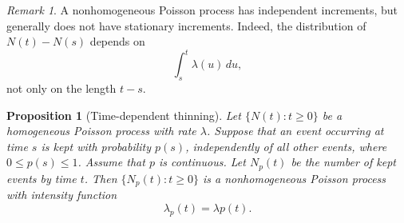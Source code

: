 \documentclass[11pt]{article}
\theoremstyle{plain}
\newtheorem{proposition}[theorem]{Proposition}
\theoremstyle{definition}
\theoremstyle{remark}
\newtheorem{remark}[theorem]{Remark}
\begin{document}
	\begin{remark}
		A nonhomogeneous Poisson process has independent increments, but generally does not have stationary increments. Indeed, the distribution of \(N(t)-N(s)\) depends on
		\[
		\int_s^t \lambda(u)\,du,
		\]
		not only on the length \(t-s\).
	\end{remark}
	
	\begin{proposition}[Time-dependent thinning]
		Let \(\{N(t):t\ge 0\}\) be a homogeneous Poisson process with rate \(\lambda\). Suppose that an event occurring at time \(s\) is kept with probability \(p(s)\), independently of all other events, where \(0\le p(s)\le 1\). Assume that \(p\) is continuous. Let \(N_p(t)\) be the number of kept events by time \(t\). Then \(\{N_p(t):t\ge 0\}\) is a nonhomogeneous Poisson process with intensity function
		\[
		\lambda_p(t)=\lambda p(t).
		\]
	\end{proposition}
	
\end{document}

